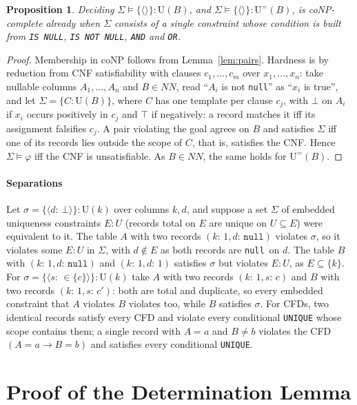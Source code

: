 \documentclass[conference]{IEEEtran}
\newtheorem{proposition}[theorem]{Proposition}
\theoremstyle{definition}
\newcommand{\sql}[1]{\texttt{#1}}
\newcommand{\nul}{\texttt{null}}
\newcommand{\NN}{\mathit{NN}}
\newcommand{\Sig}{\Sigma}
\newcommand{\U}[1]{\mathrm{U}(#1)}
\newcommand{\Ueq}[1]{\mathrm{U}^{=}(#1)}
\newcommand{\tpl}[1]{\ensuremath{\langle #1\rangle}}
\begin{document}
\begin{proposition}\label{prop:multi}
Deciding $\Sig\models\{\tpl{}\}:\U{B}$, and $\Sig\models\{\tpl{}\}:\Ueq{B}$, is coNP-complete already
when $\Sig$ consists of a single constraint whose condition is built from \sql{IS NULL},
\sql{IS NOT NULL}, \sql{AND} and \sql{OR}.
\end{proposition}

\begin{proof}
Membership in coNP follows from Lemma~\ref{lem:pairs}. Hardness is by reduction from CNF satisfiability with clauses
$c_1,\dots,c_m$ over $x_1,\dots,x_n$: take nullable columns $A_1,\dots,A_n$ and $B\in\NN$, read
``$A_i$ is not \nul'' as ``$x_i$ is true'', and let $\Sig=\{C:\U{B}\}$, where $C$ has one template
per clause $c_j$, with $\bot$ on $A_i$ if $x_i$ occurs positively in $c_j$ and $\top$ if negatively:
a record matches it iff its assignment falsifies $c_j$. A pair violating the goal agrees on $B$
and satisfies $\Sig$ iff one of its records lies outside the scope of $C$, that is, satisfies the
CNF. Hence $\Sig\models\varphi$ iff the CNF is unsatisfiable. As $B\in\NN$, the same holds for
$\Ueq{B}$.
\end{proof}

\paragraph*{Separations} Let $\sigma=\{\tpl{d{:}\,\bot}\}:\U{k}$ over columns $k,d$, and suppose a set
$\Sig$ of embedded uniqueness constraints $E:U$ (records total on $E$ are unique on $U\subseteq E$)
were equivalent to it. The table $A$ with two records $(k{:}\,1,d{:}\,\nul)$ violates $\sigma$, so it
violates some $E:U$ in $\Sig$, with $d\notin E$ as both records are \nul\ on $d$. The table $B$ with
$(k{:}\,1,d{:}\,\nul)$ and $(k{:}\,1,d{:}\,1)$ satisfies $\sigma$ but violates $E:U$, as $E\subseteq\{k\}$.
For $\sigma=\{\tpl{s{:}\,{\in}\{c\}}\}:\U{k}$ take $A$ with two records $(k{:}\,1,s{:}\,c)$ and $B$ with
two records $(k{:}\,1,s{:}\,c')$: both are total and duplicate, so every embedded constraint that $A$
violates $B$ violates too, while $B$ satisfies $\sigma$. For CFDs, two identical records satisfy
every CFD and violate every conditional \sql{UNIQUE} whose scope contains them; a single record
with $A=a$ and $B\neq b$ violates the CFD $(A=a\rightarrow B=b)$ and satisfies every conditional
\sql{UNIQUE}.

\section{Proof of the Determination Lemma}\label{app:det}
\end{document}
